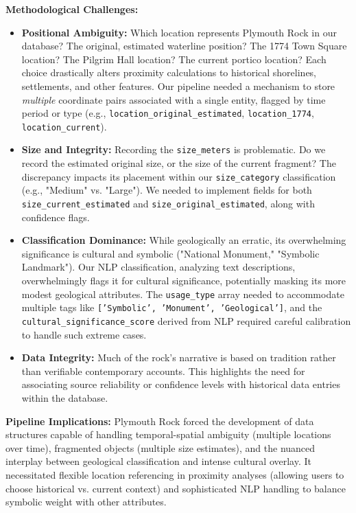 \documentclass[
11pt, %
english, %
singlespacing, %
headsepline, %
]{MastersDoctoralThesis} %
\begin{document}
\textbf{Methodological Challenges:}
\begin{itemize}
    \item \textbf{Positional Ambiguity:} Which location represents Plymouth Rock in our database? The original, estimated waterline position? The 1774 Town Square location? The Pilgrim Hall location? The current portico location? Each choice drastically alters proximity calculations to historical shorelines, settlements, and other features. Our pipeline needed a mechanism to store \emph{multiple} coordinate pairs associated with a single entity, flagged by time period or type (e.g., \texttt{location\_original\_estimated}, \texttt{location\_1774}, \texttt{location\_current}).
    \item \textbf{Size and Integrity:} Recording the \texttt{size\_meters} is problematic. Do we record the estimated original size, or the size of the current fragment? The discrepancy impacts its placement within our \texttt{size\_category} classification (e.g., "Medium" vs. "Large"). We needed to implement fields for both \texttt{size\_current\_estimated} and \texttt{size\_original\_estimated}, along with confidence flags.
    \item \textbf{Classification Dominance:} While geologically an erratic, its overwhelming significance is cultural and symbolic ("National Monument," "Symbolic Landmark"). Our NLP classification, analyzing text descriptions, overwhelmingly flags it for cultural significance, potentially masking its more modest geological attributes. The \texttt{usage\_type} array needed to accommodate multiple tags like \texttt{['Symbolic', 'Monument', 'Geological']}, and the \texttt{cultural\_significance\_score} derived from NLP required careful calibration to handle such extreme cases.
    \item \textbf{Data Integrity:} Much of the rock's narrative is based on tradition rather than verifiable contemporary accounts. This highlights the need for associating source reliability or confidence levels with historical data entries within the database.
\end{itemize}

\textbf{Pipeline Implications:} Plymouth Rock forced the development of data structures capable of handling temporal-spatial ambiguity (multiple locations over time), fragmented objects (multiple size estimates), and the nuanced interplay between geological classification and intense cultural overlay. It necessitated flexible location referencing in proximity analyses (allowing users to choose historical vs. current context) and sophisticated NLP handling to balance symbolic weight with other attributes.
\end{document}
